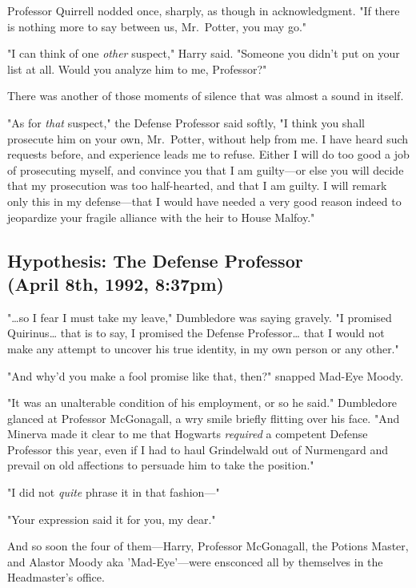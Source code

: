 Professor Quirrell nodded once, sharply, as though in acknowledgment. "If there 
is nothing more to say between us, Mr.~Potter, you may go."

"I can think of one \emph{other} suspect," Harry said. "Someone you didn't put 
on your list at all. Would you analyze him to me, Professor?"

There was another of those moments of silence that was almost a sound in itself.

"As for \emph{that} suspect," the Defense Professor said softly, "I think you 
shall prosecute him on your own, Mr.~Potter, without help from me. I have heard 
such requests before, and experience leads me to refuse. Either I will do too 
good a job of prosecuting myself, and convince you that I am guilty---or else 
you will decide that my prosecution was too half-hearted, and that I am guilty. 
I will remark only this in my defense---that I would have needed a very good 
reason indeed to jeopardize your fragile alliance with the heir to House 
Malfoy."
\sbreak

\subsection{Hypothesis: The Defense Professor\\
(April 8th, 1992, 8:37pm)}

"{\ldots}so I fear I must take my leave," Dumbledore was saying gravely. "I 
promised Quirinus{\ldots} that is to say, I promised the Defense 
Professor{\ldots} that I would not make any attempt to uncover his true 
identity, in my own person or any other."

"And why'd you make a fool promise like that, then?" snapped Mad-Eye Moody.

"It was an unalterable condition of his employment, or so he said." Dumbledore 
glanced at Professor McGonagall, a wry smile briefly flitting over his face. 
"And Minerva made it clear to me that Hogwarts \emph{required} a competent 
Defense Professor this year, even if I had to haul Grindelwald out of 
Nurmengard and prevail on old affections to persuade him to take the position."

"I did not \emph{quite} phrase it in that fashion---"

"Your expression said it for you, my dear."

And so soon the four of them---Harry, Professor McGonagall, the Potions Master, 
and Alastor Moody aka 'Mad-Eye'---were ensconced all by themselves in the 
Headmaster's office.

